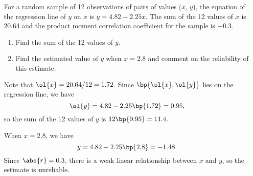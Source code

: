 \begin{problem}
    For a random sample of 12 observations of pairs of values ($x$, $y$), the equation of the regression line of $y$ on $x$ is $y=4.82-2.25x$. The sum of the 12 values of $x$ is 20.64 and the product moment correlation coefficient for the sample is $-0.3$.

    \begin{enumerate}
        \item Find the sum of the 12 values of $y$.
        \item Find the estimated value of $y$ when $x=2.8$ and comment on the reliability of this estimate.
    \end{enumerate}
\end{problem}
\begin{ppart}
    \begin{ppart}
        Note that $\ol{x} = 20.64/12 = 1.72$. Since $\bp{\ol{x}, \ol{y}}$ lies on the regression line, we have \[\ol{y} = 4.82 - 2.25\bp{1.72} = 0.95,\] so the sum of the 12 values of $y$ is $12\bp{0.95} = 11.4$.
    \end{ppart}
    \begin{ppart}
        When $x = 2.8$, we have \[y = 4.82 - 2.25\bp{2.8} = -1.48.\] Since $\abs{r} = 0.3$, there is a weak linear relationship between $x$ and $y$, so the estimate is unreliable.
    \end{ppart}
\end{ppart}

